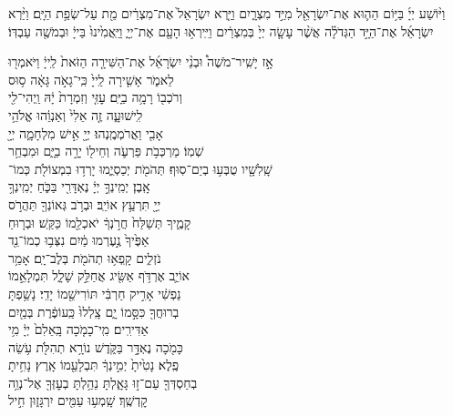 \documentclass[twoside, openany, parskip=half, 11pt]{book}
\begin{document}
וַיּ֨וֹשַׁע
יְיָ֜ בַּיּ֥וֹם הַה֛וּא אֶת־יִשְׂרָאֵ֖ל מִיַּ֣ד מִצְרָ֑יִם וַיַּ֤רְא יִשְׂרָאֵל֙ אֶת־מִצְרַ֔יִם מֵ֖ת עַל־שְׂפַ֥ת הַיָּֽם׃
וַיַּ֨רְא יִשְׂרָאֵ֜ל אֶת־הַיָּ֣ד הַגְּדֹלָ֗ה אֲשֶׁ֨ר עָשָׂ֤ה יְיָ֙ בְּמִצְרַ֔יִם וַיִּֽירְא֥וּ הָעָ֖ם אֶת־יְיָ֑ וַיַּֽאֲמִ֙ינוּ֙ בַּייָ֔ וּבְמֹשֶׁ֖ה עַבְדּֽוֹ׃

אָ֣ז \hfill
יָשִֽׁיר־מֹשֶׁה֩ \hfill וּבְנֵ֨י \hfill יִשְׂרָאֵ֜ל \hfill אֶת־הַשִּׁירָ֤ה \hfill הַזֹּאת֙ \hfill לַֽייָ֔ \hfill וַיֹּאמְר֖וּ \\
לֵאמֹ֑ר \hfill אָשִׁ֤ירָה לַֽייָ֙ כִּֽי־גָאֹ֣ה גָּאָ֔ה \hfill ס֥וּס \\
וְרֹכְב֖וֹ רָמָ֥ה בַיָּֽם׃ \hfill עׇזִּ֤י וְזִמְרָת֙ יָ֔הּ וַֽיְהִי־לִ֖י \\
לִֽישׁוּעָ֑ה \hfill זֶ֤ה אֵלִי֙ וְאַנְוֵ֔הוּ \hfill אֱלֹהֵ֥י \\
אָבִ֖י וַאֲרֹמְמֶֽנְהוּ׃ \hfill יְיָ֖ אִ֣ישׁ מִלְחָמָ֑ה יְיָ֖ \\
שְׁמֽוֹ׃ \hfill מַרְכְּבֹ֥ת פַּרְעֹ֛ה וְחֵיל֖וֹ יָרָ֣ה בַיָּ֑ם \hfill וּמִבְחַ֥ר\\
שָֽׁלִשָׁ֖יו טֻבְּע֥וּ בְיַם־סֽוּף׃ \hfill תְּהֹמֹ֖ת יְכַסְיֻ֑מוּ יָרְד֥וּ בִמְצוֹלֹ֖ת כְּמוֹ־\\
אָֽבֶן׃ \hfill יְמִֽינְךָ֣ יְיָ֔ נֶאְדָּרִ֖י בַּכֹּ֑חַ \hfill יְמִֽינְךָ֥ \\
יְיָ֖ תִּרְעַ֥ץ אוֹיֵֽב׃ \hfill וּבְרֹ֥ב גְּאוֹנְךָ֖ תַּהֲרֹ֣ס \\
קָמֶ֑יךָ \hfill תְּשַׁלַּח֙ חֲרֹ֣נְךָ֔ יֹאכְלֵ֖מוֹ כַּקַּֽשׁ׃ \hfill וּבְר֤וּחַ \\
אַפֶּ֙יךָ֙ נֶ֣עֶרְמוּ מַ֔יִם \hfill נִצְּב֥וּ כְמוֹ־נֵ֖ד \\
נֹזְלִ֑ים \hfill קָֽפְא֥וּ תְהֹמֹ֖ת בְּלֶב־יָֽם׃ \hfill אָמַ֥ר \\
אוֹיֵ֛ב אֶרְדֹּ֥ף אַשִּׂ֖יג \hfill אֲחַלֵּ֣ק שָׁלָ֑ל תִּמְלָאֵ֣מוֹ \\
נַפְשִׁ֔י \hfill אָרִ֣יק חַרְבִּ֔י תּוֹרִישֵׁ֖מוֹ יָדִֽי׃ \hfill נָשַׁ֥פְתָּ \\
בְרוּחֲךָ֖ כִּסָּ֣מוֹ יָ֑ם \hfill צָֽלְלוּ֙ כַּֽעוֹפֶ֔רֶת בְּמַ֖יִם \\
אַדִּירִֽים׃ \hfill מִֽי־כָמֹ֤כָה בָּֽאֵלִם֙ יְיָ֔ \hfill מִ֥י \\
כָּמֹ֖כָה נֶאְדָּ֣ר בַּקֹּ֑דֶשׁ \hfill נוֹרָ֥א תְהִלֹּ֖ת עֹ֥שֵׂה \\
פֶֽלֶא׃ \hfill נָטִ֙יתָ֙ יְמִ֣ינְךָ֔ תִּבְלָעֵ֖מוֹ אָֽרֶץ׃ \hfill נָחִ֥יתָ \\
בְחַסְדְּךָ֖ עַם־ז֣וּ גָּאָ֑לְתָּ \hfill נֵהַ֥לְתָּ בְעׇזְּךָ֖ אֶל־נְוֵ֥ה \\
קׇדְשֶֽׁךָ׃ \hfill שָֽׁמְע֥וּ עַמִּ֖ים יִרְגָּז֑וּן \hfill חִ֣יל \\
\end{document}
